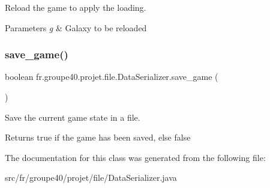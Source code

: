 Reload the game to apply the loading. 


\begin{DoxyParams}{Parameters}
{\em g} & Galaxy to be reloaded \\
\hline
\end{DoxyParams}
\mbox{\label{classfr_1_1groupe40_1_1projet_1_1file_1_1_data_serializer_a007629e3f94601342175120cd37b9f2a}} 
\subsubsection{\texorpdfstring{save\+\_\+game()}{save\_game()}}
{\footnotesize\ttfamily boolean fr.\+groupe40.\+projet.\+file.\+Data\+Serializer.\+save\+\_\+game (\begin{DoxyParamCaption}{ }\end{DoxyParamCaption})}



Save the current game state in a file. 

\begin{DoxyReturn}{Returns}
true if the game has been saved, else false 
\end{DoxyReturn}


The documentation for this class was generated from the following file\+:\begin{DoxyCompactItemize}
\item 
src/fr/groupe40/projet/file/Data\+Serializer.\+java\end{DoxyCompactItemize}
